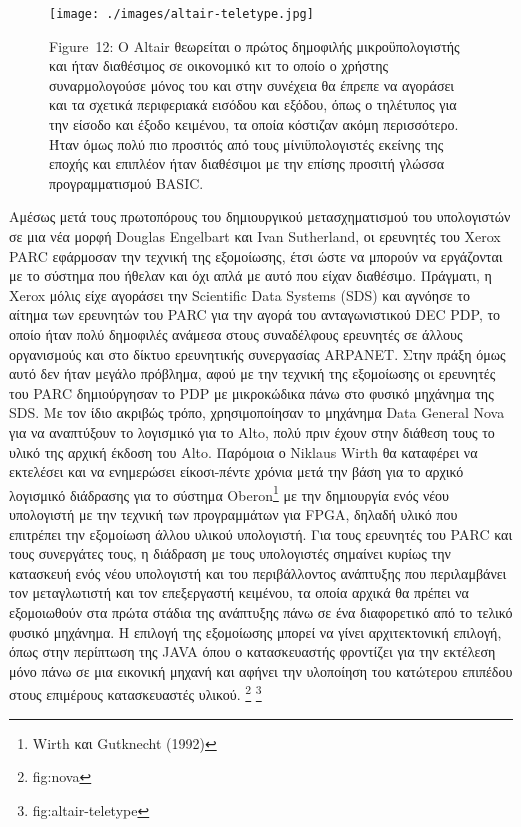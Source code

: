 \documentclass[
]{article}
\begin{document}
\leavevmode{}%
\begin{figure}
\hypertarget{fig:altair-teletype}{%
\centering
\texttt{[image: ./images/altair-teletype.jpg]}
\caption{Figure~12: O Altair θεωρείται ο πρώτος δημοφιλής
μικροϋπολογιστής και ήταν διαθέσιμος σε οικονομικό κιτ το οποίο ο
χρήστης συναρμολογούσε μόνος του και στην συνέχεια θα έπρεπε να αγοράσει
και τα σχετικά περιφεριακά εισόδου και εξόδου, όπως ο τηλέτυπος για την
είσοδο και έξοδο κειμένου, τα οποία κόστιζαν ακόμη περισσότερο. Ήταν
όμως πολύ πιο προσιτός από τους μίνιϋπολογιστές εκείνης της εποχής και
επιπλέον ήταν διαθέσιμοι με την επίσης προσιτή γλώσσα προγραμματισμού
BASIC.}\label{fig:altair-teletype}
}
\end{figure}

Αμέσως μετά τους πρωτοπόρους του δημιουργικού μετασχηματισμού του
υπολογιστών σε μια νέα μορφή Douglas Engelbart και Ivan Sutherland, οι
ερευνητές του Xerox PARC εφάρμοσαν την τεχνική της εξομοίωσης, έτσι ώστε
να μπορούν να εργάζονται με το σύστημα που ήθελαν και όχι απλά με αυτό
που είχαν διαθέσιμο. Πράγματι, η Xerox μόλις είχε αγοράσει την
Scientific Data Systems (SDS) και αγνόησε το αίτημα των ερευνητών του
PARC για την αγορά του ανταγωνιστικού DEC PDP, το οποίο ήταν πολύ
δημοφιλές ανάμεσα στους συναδέλφους ερευνητές σε άλλους οργανισμούς και
στο δίκτυο ερευνητικής συνεργασίας ARPANET. Στην πράξη όμως αυτό δεν
ήταν μεγάλο πρόβλημα, αφού με την τεχνική της εξομοίωσης οι ερευνητές
του PARC δημιούργησαν το PDP με μικροκώδικα πάνω στο φυσικό μηχάνημα της
SDS. Με τον ίδιο ακριβώς τρόπο, χρησιμοποίησαν το μηχάνημα Data General
Nova για να αναπτύξουν το λογισμικό για το Alto, πολύ πριν έχουν στην
διάθεση τους το υλικό της αρχική έκδοση του Alto. Παρόμοια ο Niklaus
Wirth θα καταφέρει να εκτελέσει και να ενημερώσει είκοσι-πέντε χρόνια
μετά την βάση για το αρχικό λογισμικό διάδρασης για το σύστημα
Oberon\footnote{Wirth και Gutknecht (1992)} με την δημιουργία ενός νέου
υπολογιστή με την τεχνική των προγραμμάτων για FPGA, δηλαδή υλικό που
επιτρέπει την εξομοίωση άλλου υλικού υπολογιστή. Για τους ερευνητές του
PARC και τους συνεργάτες τους, η διάδραση με τους υπολογιστές σημαίνει
κυρίως την κατασκευή ενός νέου υπολογιστή και του περιβάλλοντος
ανάπτυξης που περιλαμβάνει τον μεταγλωτιστή και τον επεξεργαστή
κειμένου, τα οποία αρχικά θα πρέπει να εξομοιωθούν στα πρώτα στάδια της
ανάπτυξης πάνω σε ένα διαφορετικό από το τελικό φυσικό μηχάνημα. Η
επιλογή της εξομοίωσης μπορεί να γίνει αρχιτεκτονική επιλογή, όπως στην
περίπτωση της JAVA όπου ο κατασκευαστής φροντίζει για την εκτέλεση μόνο
πάνω σε μια εικονική μηχανή και αφήνει την υλοποίηση του κατώτερου
επιπέδου στους επιμέρους κατασκευαστές υλικού. \footnote{fig:nova}
\footnote{fig:altair-teletype}
\end{document}
